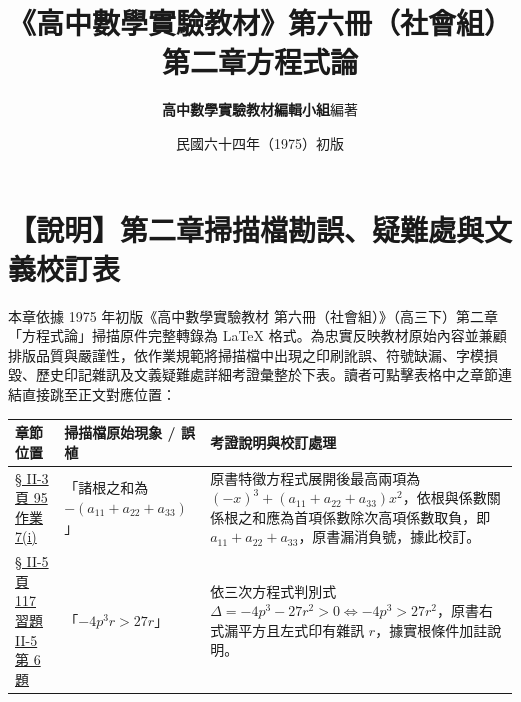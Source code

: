 \documentclass[a4paper,12pt,twoside]{article}
\title{\LARGE\textbf{《高中數學實驗教材》第六冊（社會組）}\\[0.5em] \Large\textbf{第二章\quad 方程式論}}
\author{\textbf{高中數學實驗教材編輯小組}\quad 編著}
\date{民國六十四年（1975）初版}
\begin{document}
\maketitle
\thispagestyle{firstpage}

\section*{【說明】第二章掃描檔勘誤、疑難處與文義校訂表}
\label{sec:errata_notes_b6_ch2}
\label{sec:current_errata}

本章依據 1975 年初版《高中數學實驗教材 第六冊（社會組）》（高三下）第二章「方程式論」掃描原件完整轉錄為 \LaTeX{} 格式。為忠實反映教材原始內容並兼顧排版品質與嚴謹性，依作業規範將掃描檔中出現之印刷訛誤、符號缺漏、字模損毀、歷史印記雜訊及文義疑難處詳細考證彙整於下表。讀者可點擊表格中之章節連結直接跳至正文對應位置：

\begin{table}[H]
\centering
\small
\renewcommand{\arraystretch}{1.35}
\begin{tabularx}{\textwidth}{|p{3.2cm}|p{3.8cm}|X|}
\hline
\textbf{章節位置} & \textbf{掃描檔原始現象 / 誤植} & \textbf{考證說明與校訂處理} \\ \hline

\hyperref[note:b6s-ch2-p95-trace]{§ II-3 頁 95 作業 7(i)} & 
「諸根之和為 $-(a_{11}+a_{22}+a_{33})$」 & 
原書特徵方程式展開後最高兩項為 $(-x)^3 + (a_{11}+a_{22}+a_{33})x^2$，依根與係數關係根之和應為首項係數除次高項係數取負，即 $a_{11}+a_{22}+a_{33}$，原書漏消負號，據此校訂。 \\ \hline

\hyperref[note:b6s-ch2-p117-cubic-ineq]{§ II-5 頁 117 習題 II-5 第 6 題} & 
「$-4p^3r > 27r$」 & 
依三次方程式判別式 $\Delta = -4p^3 - 27r^2 > 0 \iff -4p^3 > 27r^2$，原書右式漏平方且左式印有雜訊 $r$，據實根條件加註說明。 \\ \hline

\end{tabularx}
\end{table}

\newpage
\renewcommand{\contentsname}{目\qquad 次}
\tableofcontents
\newpage

\setcounter{section}{1}

\end{document}
